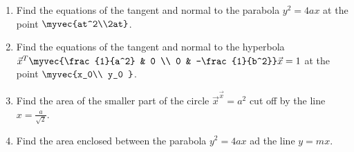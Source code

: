 \begin{enumerate}[label=\arabic*.,ref=\thesubsection.\theenumi]
\item Find the equations of the tangent and normal to the parabola 
$y^2 = 4ax$ at the point $\myvec{at^2\\2at}$.
\item Find the equations of the tangent and normal to the hyperbola 
$
\vec{x}^T\myvec{\frac{1}{a^2} & 0 \\ 0 & -\frac{1}{b^2}}\vec{x} = 1
$
at the point $\myvec{x_0\\ y_0 }$.
\item  Find the area of the smaller part of the circle $\vec{x}^\vec{x}=a^2$ cut off by the line $x = \frac{a}{\sqrt{2}}$.
\item Find the area enclosed between the parabola $y^2=4ax$ ad the line $y = mx$.

\end{enumerate}
